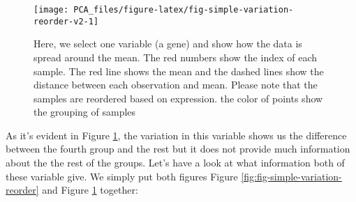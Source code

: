 \documentclass[
]{book}
\newenvironment{Shaded}{\begin{snugshade}}{\end{snugshade}}
\newcommand{\CommentTok}[1]{\textcolor[rgb]{0.56,0.35,0.01}{\textit{#1}}}
\newcommand{\ControlFlowTok}[1]{\textcolor[rgb]{0.13,0.29,0.53}{\textbf{#1}}}
\newcommand{\DataTypeTok}[1]{\textcolor[rgb]{0.13,0.29,0.53}{#1}}
\newcommand{\DecValTok}[1]{\textcolor[rgb]{0.00,0.00,0.81}{#1}}
\newcommand{\KeywordTok}[1]{\textcolor[rgb]{0.13,0.29,0.53}{\textbf{#1}}}
\newcommand{\NormalTok}[1]{#1}
\newcommand{\OperatorTok}[1]{\textcolor[rgb]{0.81,0.36,0.00}{\textbf{#1}}}
\newcommand{\StringTok}[1]{\textcolor[rgb]{0.31,0.60,0.02}{#1}}
\theoremstyle{definition}
\theoremstyle{definition}
\theoremstyle{definition}
\theoremstyle{remark}
\begin{document}
\begin{Shaded}
\end{Shaded}

\begin{figure}

{\centering \texttt{[image: PCA\_files/figure-latex/fig-simple-variation-reorder-v2-1]} 

}

\caption{Here, we select one variable (a gene) and show how the data is spread around the mean. The red numbers show the index of each sample. The red line shows the mean and the dashed lines show the distance between each observation and mean. Please note that the samples are reordered based on expression. the color of points show the grouping of samples}\label{fig:fig-simple-variation-reorder-v2}
\end{figure}

As it's evident in Figure \ref{fig:fig-simple-variation-reorder-v2}, the variation in this variable shows us the difference between the fourth group and the rest but it does not provide much information about the the rest of the groups. Let's have a look at what information both of these variable give. We simply put both figures Figure \ref{fig:fig-simple-variation-reorder} and Figure \ref{fig:fig-simple-variation-reorder-v2} together:
\end{document}
